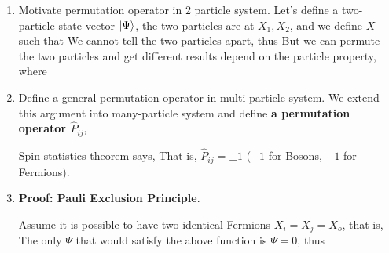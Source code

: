 \documentclass{school-22.101-notes}
\begin{document}
\begin{enumerate}
\item Motivate permutation operator in 2 particle system. Let's define a two-particle state vector $\left| \Psi \right>$, the two particles are at $X_1, X_2$, and we define $X$ such that 
We cannot tell the two particles apart, thus 
But we can permute the two particles and get different results depend on the particle property, 
where

\item Define a general permutation operator in multi-particle system. 
We extend this argument into many-particle system and define \textbf{a permutation operator $\hat{P}_{ij}$}, 

Spin-statistics theorem says, 
That is, $\hat{P}_{ij} = \pm 1$ ($+1$ for Bosons, $-1$ for Fermions). 


\item \textbf{Proof: Pauli Exclusion Principle}. 

Assume it is possible to have two identical Fermions $X_i = X_j = X_o$, that is, 
The only $\Psi$ that would satisfy the above function is $\Psi = 0$, thus  
\end{enumerate}
\end{document}
